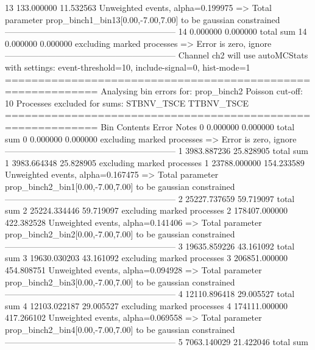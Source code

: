 13         133.000000      11.532563       Unweighted events, alpha=0.199975
  => Total parameter prop_binch1_bin13[0.00,-7.00,7.00] to be gaussian constrained
------------------------------------------------------------
14         0.000000        0.000000        total sum                     
14         0.000000        0.000000        excluding marked processes    
  => Error is zero, ignore      
------------------------------------------------------------
Channel ch2 will use autoMCStats with settings: event-threshold=10, include-signal=0, hist-mode=1
============================================================
Analysing bin errors for: prop_binch2
Poisson cut-off: 10
Processes excluded for sums: STBNV_TSCE TTBNV_TSCE
============================================================
Bin        Contents        Error           Notes                         
0          0.000000        0.000000        total sum                     
0          0.000000        0.000000        excluding marked processes    
  => Error is zero, ignore      
------------------------------------------------------------
1          3983.887236     25.828905       total sum                     
1          3983.664348     25.828905       excluding marked processes    
1          23788.000000    154.233589      Unweighted events, alpha=0.167475
  => Total parameter prop_binch2_bin1[0.00,-7.00,7.00] to be gaussian constrained
------------------------------------------------------------
2          25227.737659    59.719097       total sum                     
2          25224.334446    59.719097       excluding marked processes    
2          178407.000000   422.382528      Unweighted events, alpha=0.141406
  => Total parameter prop_binch2_bin2[0.00,-7.00,7.00] to be gaussian constrained
------------------------------------------------------------
3          19635.859226    43.161092       total sum                     
3          19630.030203    43.161092       excluding marked processes    
3          206851.000000   454.808751      Unweighted events, alpha=0.094928
  => Total parameter prop_binch2_bin3[0.00,-7.00,7.00] to be gaussian constrained
------------------------------------------------------------
4          12110.896418    29.005527       total sum                     
4          12103.022187    29.005527       excluding marked processes    
4          174111.000000   417.266102      Unweighted events, alpha=0.069558
  => Total parameter prop_binch2_bin4[0.00,-7.00,7.00] to be gaussian constrained
------------------------------------------------------------
5          7063.140029     21.422046       total sum                     
